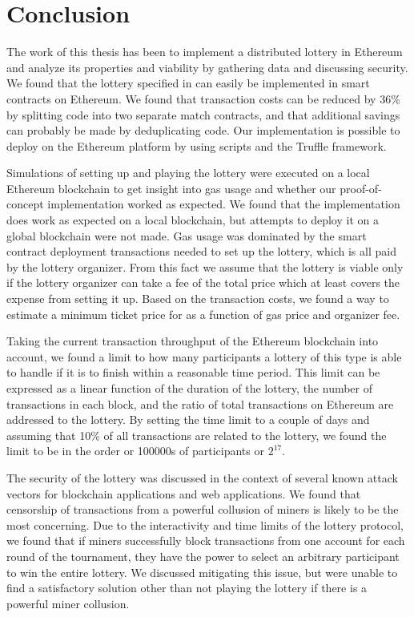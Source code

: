 \chapter{Conclusion}
\label{chap:conclusion}


The work of this thesis has been to implement a distributed lottery in Ethereum and analyze its properties and viability by gathering data and discussing security. We found that the lottery specified in \cite{miller_zero-collateral_2017} can easily be implemented in smart contracts on Ethereum. We found that transaction costs can be reduced by 36\% by splitting code into two separate match contracts, and that additional savings can probably be made by deduplicating code. Our implementation is possible to deploy on the Ethereum platform by using scripts and the Truffle framework.

Simulations of setting up and playing the lottery were executed on a local Ethereum blockchain to get insight into gas usage and whether our proof-of-concept implementation worked as expected. We found that the implementation does work as expected on a local blockchain, but attempts to deploy it on a global blockchain were not made. Gas usage was dominated by the smart contract deployment transactions needed to set up the lottery, which is all paid by the lottery organizer. From this fact we assume that the lottery is viable only if the lottery organizer can take a fee of the total price which at least covers the expense from setting it up. Based on the transaction costs, we found a way to estimate a minimum ticket price for as a function of gas price and organizer fee.

Taking the current transaction throughput of the Ethereum blockchain into account, we found a limit to how many participants a lottery of this type is able to handle if it is to finish within a reasonable time period. This limit can be expressed as a linear function of the duration of the lottery, the number of transactions in each block, and the ratio of total transactions on Ethereum are addressed to the lottery. By setting the time limit to a couple of days and assuming that 10\% of all transactions are related to the lottery, we found the limit to be in the order or 100000s of participants or $2^{17}$.

The security of the lottery was discussed in the context of several known attack vectors for blockchain applications and web applications. We found that censorship of transactions from a powerful collusion of miners is likely to be the most concerning. Due to the interactivity and time limits of the lottery protocol, we found that if miners successfully block transactions from one account for each round of the tournament, they have the power to select an arbitrary participant to win the entire lottery.
We discussed mitigating this issue, but were unable to find a satisfactory solution other than not playing the lottery if there is a powerful miner collusion. 

